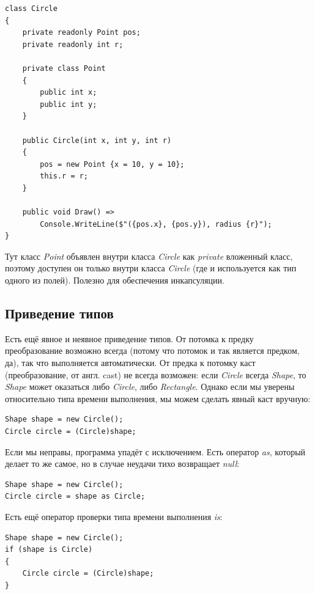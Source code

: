 \documentclass[a5paper]{article}
\begin{document}
\begin{verbatim}
class Circle
{
    private readonly Point pos;
    private readonly int r;

    private class Point
    {
        public int x;
        public int y;
    }

    public Circle(int x, int y, int r)
    {
        pos = new Point {x = 10, y = 10};
        this.r = r;
    }

    public void Draw() =>
        Console.WriteLine($"({pos.x}, {pos.y}), radius {r}");
}
\end{verbatim}

Тут класс \textit{Point} объявлен внутри класса \textit{Circle} как \textit{private} вложенный класс, поэтому доступен он только внутри класса \textit{Circle} (где и используется как тип одного из полей). Полезно для обеспечения инкапсуляции.

\subsection{Приведение типов}

Есть ещё явное и неявное приведение типов. От потомка к предку преобразование возможно всегда (потому что потомок и так является предком, да), так что выполняется автоматически. От предка к потомку каст (преобразование, от англ. cast) не всегда возможен: если \textit{Circle} всегда \textit{Shape}, то \textit{Shape} может оказаться либо \textit{Circle}, либо \textit{Rectangle}. Однако если мы уверены относительно типа времени выполнения, мы можем сделать явный каст вручную: 

\begin{verbatim}
Shape shape = new Circle();
Circle circle = (Circle)shape;
\end{verbatim}

Если мы неправы, программа упадёт с исключением. Есть оператор \textit{as}, который делает то же самое, но в случае неудачи тихо возвращает \textit{null}:

\begin{verbatim}
Shape shape = new Circle();
Circle circle = shape as Circle;
\end{verbatim}

Есть ещё оператор проверки типа времени выполнения \textit{is}:

\begin{verbatim}
Shape shape = new Circle();
if (shape is Circle) 
{
    Circle circle = (Circle)shape;
}
\end{verbatim}
\end{document}
